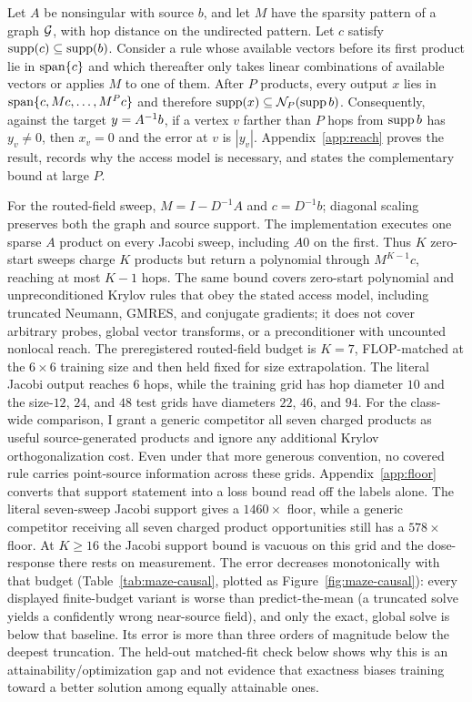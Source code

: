 \begin{proposition}
\label{prop:reach}
Let $A$ be nonsingular with source $b$, and let $M$ have the sparsity pattern
of a graph $\mathcal{G}$, with hop distance on the undirected pattern. Let $c$ satisfy
$\operatorname{supp}(c)\subseteq\operatorname{supp}(b)$. Consider a
rule whose available vectors before its first product lie in $\operatorname{span}\{c\}$ and
which thereafter only takes linear combinations of available vectors or
applies $M$ to one of them. After $P$ products, every output $x$ lies in
$\operatorname{span}\{c,Mc,\dots,M^{P}c\}$ and therefore
$\operatorname{supp}(x)\subseteq\mathcal{N}_{P}(\operatorname{supp} b)$. Consequently, against the target
$y=A^{-1}b$, if a vertex $v$ farther than $P$ hops from $\operatorname{supp} b$ has
$y_v\neq0$, then $x_v=0$ and the error at $v$ is $|y_v|$.
Appendix~\ref{app:reach} proves the result,
records why the access model is necessary, and states the complementary bound
at large $P$.
\end{proposition}

For the routed-field sweep, $M=I-D^{-1}A$ and $c=D^{-1}b$; diagonal scaling
preserves both the graph and source support. The implementation executes one
sparse $A$ product on every Jacobi sweep, including $A0$ on the first. Thus
$K$ zero-start sweeps charge $K$ products but return a polynomial through
$M^{K-1}c$, reaching at most $K-1$ hops. The same
bound covers zero-start polynomial and unpreconditioned Krylov rules that obey
the stated access model, including truncated Neumann, GMRES, and conjugate
gradients; it does not cover arbitrary probes, global vector transforms, or a
preconditioner with uncounted nonlocal reach. The preregistered routed-field
budget is $K=7$, FLOP-matched at the $6\times6$ training size and then held
fixed for size extrapolation. The literal Jacobi output reaches $6$ hops, while
the training grid has
hop diameter $10$ and the size-$12$, $24$, and $48$ test grids have diameters
$22$, $46$, and $94$. For the class-wide comparison, I grant a generic
competitor all seven charged products as useful source-generated products and
ignore any additional Krylov orthogonalization cost. Even under that more
generous convention, no covered rule carries point-source information across
these grids.
Appendix~\ref{app:floor} converts that support statement into a loss bound read
off the labels alone. The literal seven-sweep Jacobi support gives a
$1460\times$ floor, while a generic competitor receiving all seven charged
product opportunities still has a $578\times$ floor. At $K\geq16$ the Jacobi
support bound is vacuous on this grid and the dose-response there rests on
measurement. The error decreases monotonically
with that budget
(Table~\ref{tab:maze-causal}, plotted as Figure~\ref{fig:maze-causal}): every displayed
finite-budget variant is worse than predict-the-mean (a truncated solve yields
a confidently wrong near-source field), and only the exact, global solve is
below that baseline. Its error is more than three orders of magnitude below
the deepest truncation. The held-out matched-fit check below shows why this is
an attainability/optimization gap and not evidence that exactness biases
training toward a better solution among equally attainable ones.

